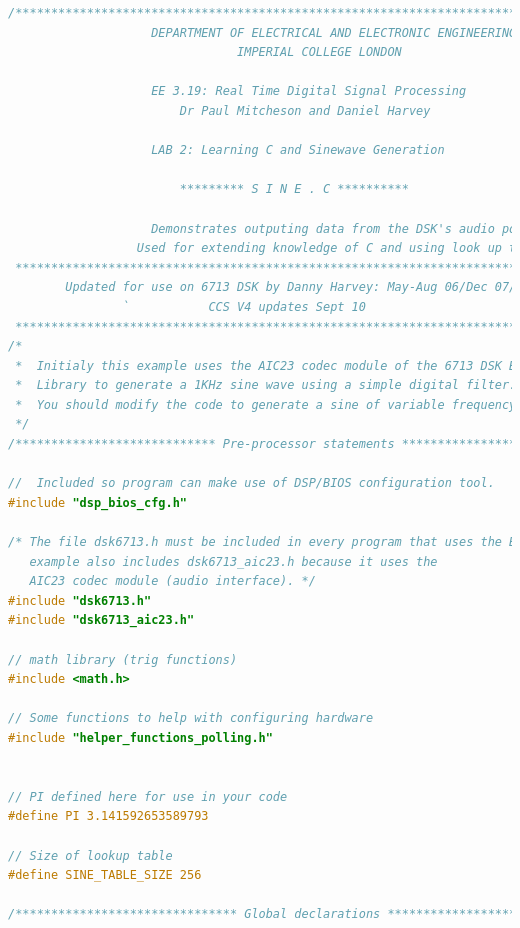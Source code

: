 \documentclass{article}
\begin{document}
\begin{lstlisting}[language=C, caption=Full Code Listing]
/*************************************************************************************
                    DEPARTMENT OF ELECTRICAL AND ELECTRONIC ENGINEERING
                                IMPERIAL COLLEGE LONDON 

                    EE 3.19: Real Time Digital Signal Processing
                        Dr Paul Mitcheson and Daniel Harvey

                    LAB 2: Learning C and Sinewave Generation 

                        ********* S I N E . C **********

                    Demonstrates outputing data from the DSK's audio port. 
                  Used for extending knowledge of C and using look up tables.
 *************************************************************************************
        Updated for use on 6713 DSK by Danny Harvey: May-Aug 06/Dec 07/Oct 09
                `           CCS V4 updates Sept 10
 ************************************************************************************/
/*
 *  Initialy this example uses the AIC23 codec module of the 6713 DSK Board Support
 *  Library to generate a 1KHz sine wave using a simple digital filter. 
 *  You should modify the code to generate a sine of variable frequency.
 */
/**************************** Pre-processor statements ******************************/

//  Included so program can make use of DSP/BIOS configuration tool.  
#include "dsp_bios_cfg.h"

/* The file dsk6713.h must be included in every program that uses the BSL.  This 
   example also includes dsk6713_aic23.h because it uses the 
   AIC23 codec module (audio interface). */
#include "dsk6713.h"
#include "dsk6713_aic23.h"

// math library (trig functions)
#include <math.h>

// Some functions to help with configuring hardware
#include "helper_functions_polling.h"


// PI defined here for use in your code 
#define PI 3.141592653589793

// Size of lookup table
#define SINE_TABLE_SIZE 256

/******************************* Global declarations ********************************/


\end{lstlisting}
\end{document}
